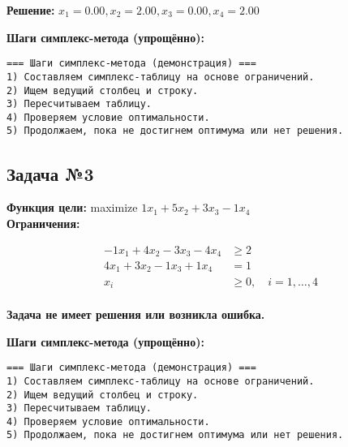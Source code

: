\documentclass[a4paper,12pt]{article}
\begin{document}
\textbf{Решение: }$x_{1}=0.00, x_{2}=2.00, x_{3}=0.00, x_{4}=2.00$

\textbf{Шаги симплекс-метода (упрощённо):}

\begin{verbatim}
=== Шаги симплекс-метода (демонстрация) ===
1) Составляем симплекс-таблицу на основе ограничений.
2) Ищем ведущий столбец и строку.
3) Пересчитываем таблицу.
4) Проверяем условие оптимальности.
5) Продолжаем, пока не достигнем оптимума или нет решения.

\end{verbatim}



\subsection*{Задача №3}
\textbf{Функция цели: }
maximize $ 1x_{1} +5x_{2} +3x_{3} -1x_{4} $\\

\textbf{Ограничения:}

\[ \begin{aligned}
-1x_{1} +4x_{2} -3x_{3} -4x_{4} &\ge 2 \\ 
4x_{1} +3x_{2} -1x_{3} +1x_{4} &= 1 \\ 
x_i &\ge 0, \quad i=1,\dots,4 \\ 
\end{aligned}\]

\textbf{Задача не имеет решения или возникла ошибка.}

\textbf{Шаги симплекс-метода (упрощённо):}

\begin{verbatim}
=== Шаги симплекс-метода (демонстрация) ===
1) Составляем симплекс-таблицу на основе ограничений.
2) Ищем ведущий столбец и строку.
3) Пересчитываем таблицу.
4) Проверяем условие оптимальности.
5) Продолжаем, пока не достигнем оптимума или нет решения.

\end{verbatim}
\end{document}
